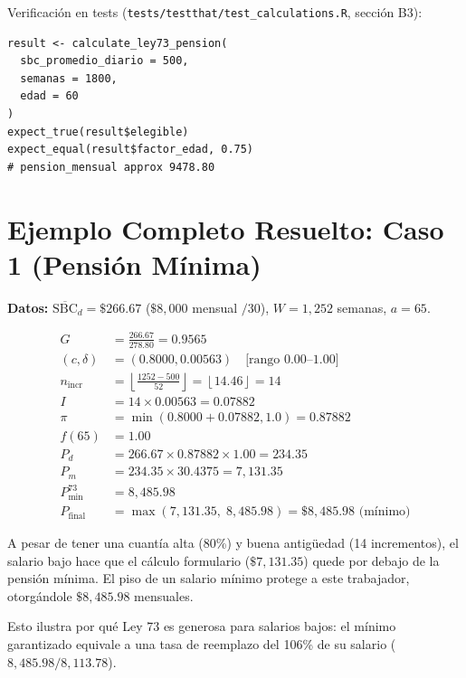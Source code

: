 \documentclass[11pt,a4paper]{report}
\theoremstyle{remark}
\begin{document}
\begin{tcolorbox}[colback=orange!5!white, colframe=orange!75!black, title=\textbf{Aplicaci\'on en C\'odigo}]
Verificaci\'on en tests (\texttt{tests/testthat/test\_calculations.R}, secci\'on B3):
\begin{lstlisting}
result <- calculate_ley73_pension(
  sbc_promedio_diario = 500,
  semanas = 1800,
  edad = 60
)
expect_true(result$elegible)
expect_equal(result$factor_edad, 0.75)
# pension_mensual approx 9478.80
\end{lstlisting}
\end{tcolorbox}

\section{Ejemplo Completo Resuelto: Caso 1 (Pensi\'on M\'inima)}

\begin{tcolorbox}[colback=blue!5!white, colframe=blue!75!black, title=\textbf{Definici\'on Formal}]
\textbf{Datos:} $\overline{\text{SBC}}_d = \$266.67$ ($\$8{,}000$ mensual $/ 30$), $W = 1{,}252$ semanas, $a = 65$.

\begin{align}
G &= \frac{266.67}{278.80} = 0.9565 \\
(c, \delta) &= (0.8000, 0.00563) \quad \text{[rango 0.00--1.00]} \\
n_{\text{incr}} &= \left\lfloor \frac{1252 - 500}{52} \right\rfloor = \left\lfloor 14.46 \right\rfloor = 14 \\
I &= 14 \times 0.00563 = 0.07882 \\
\pi &= \min(0.8000 + 0.07882, 1.0) = 0.87882 \\
f(65) &= 1.00 \\
P_d &= 266.67 \times 0.87882 \times 1.00 = 234.35 \\
P_m &= 234.35 \times 30.4375 = 7{,}131.35 \\
P_{\min}^{73} &= 8{,}485.98 \\
P_{\text{final}} &= \max(7{,}131.35, \; 8{,}485.98) = \boxed{\$8{,}485.98 \text{ (m\'inimo)}}
\end{align}
\end{tcolorbox}

\begin{tcolorbox}[colback=green!5!white, colframe=green!50!black, title=\textbf{Intuici\'on}]
A pesar de tener una cuant\'ia alta (80\%) y buena antig\"uedad (14 incrementos), el salario bajo hace que el c\'alculo formulario ($\$7{,}131.35$) quede por debajo de la pensi\'on m\'inima. El piso de un salario m\'inimo protege a este trabajador, otorg\'andole $\$8{,}485.98$ mensuales.

Esto ilustra por qu\'e Ley 73 es generosa para salarios bajos: el m\'inimo garantizado equivale a una tasa de reemplazo del 106\% de su salario ($8{,}485.98 / 8{,}113.78$).
\end{tcolorbox}
\end{document}

